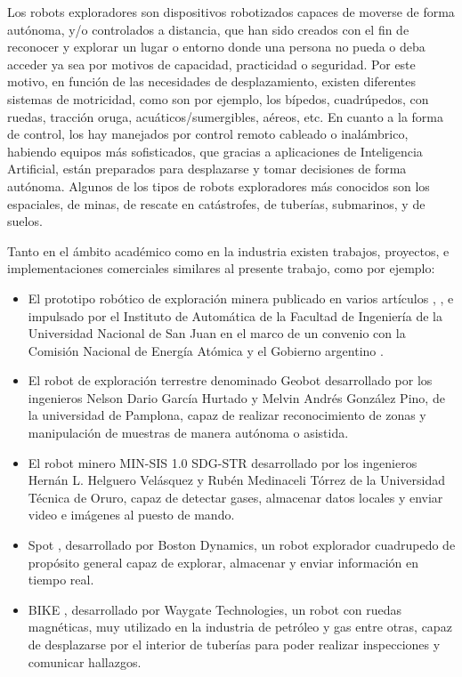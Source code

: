 Los robots exploradores son dispositivos robotizados capaces de moverse de forma autónoma, y/o controlados a distancia, que han sido creados con el fin de reconocer y explorar un lugar o entorno donde una persona no pueda o deba acceder ya sea por motivos de capacidad, practicidad o seguridad. Por este motivo, en función de las necesidades de desplazamiento, existen diferentes sistemas de motricidad, como son por ejemplo, los bípedos, cuadrúpedos, con ruedas, tracción oruga, acuáticos/sumergibles, aéreos, etc. En cuanto a la forma de control, los hay manejados por control remoto cableado o inalámbrico, habiendo equipos más sofisticados, que gracias a aplicaciones de Inteligencia Artificial, están preparados para desplazarse y tomar decisiones de forma autónoma. Algunos de los tipos de robots exploradores más conocidos son los espaciales, de minas, de rescate en catástrofes, de tuberías, submarinos, y de suelos.

Tanto en el ámbito académico como en la industria existen trabajos, proyectos, e implementaciones comerciales similares al presente trabajo, como por ejemplo: 

\begin{itemize}
	\item El prototipo robótico de exploración minera publicado en varios artículos \cite{latam-mining-robot-minero-unsj}, \cite{diario-de-cuyo-prototipo-robotico}, e impulsado por el Instituto de Automática de la Facultad de Ingeniería de la Universidad Nacional de San Juan en el marco de un convenio con la Comisión Nacional de Energía Atómica y el Gobierno argentino \cite{comunicacion-unsj-prototipo-convenio}.

	\item El robot de exploración terrestre denominado Geobot \cite{geobot} desarrollado por los ingenieros Nelson Dario García Hurtado y Melvin Andrés González Pino, de la universidad de Pamplona, capaz de realizar reconocimiento de zonas y manipulación de muestras de manera autónoma o asistida.

	\item El robot minero MIN-SIS 1.0 SDG-STR \cite{min-sis} desarrollado por los ingenieros Hernán L. Helguero Velásquez y Rubén Medinaceli Tórrez de la Universidad Técnica de Oruro, capaz de detectar gases, almacenar datos locales y enviar video e imágenes al puesto de mando.

	\item Spot \cite{spot}, desarrollado por Boston Dynamics, un robot explorador cuadrupedo de propósito general capaz de explorar, almacenar y enviar información en tiempo real.
	  
	\item BIKE \cite{bike_inspection}, desarrollado por Waygate Technologies, un robot con ruedas magnéticas, muy utilizado en la industria de petróleo y gas entre otras, capaz de desplazarse por el interior de tuberías para poder realizar inspecciones y comunicar hallazgos.

\end{itemize}






